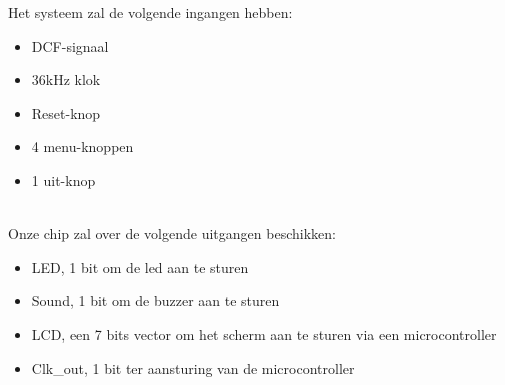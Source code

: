 Het systeem zal de volgende ingangen hebben:
\begin{itemize}[nolistsep]
\item	DCF-signaal
\item	36kHz klok
\item	Reset-knop
\item	4 menu-knoppen
\item  1 uit-knop
\end{itemize}

\noindent
\\
Onze chip zal over de volgende uitgangen beschikken:
\begin{itemize}[nolistsep]
\item	LED, 1 bit om de led aan te sturen
\item	Sound, 1 bit om de buzzer aan te sturen
\item	LCD, een 7 bits vector om het scherm aan te sturen via een microcontroller
\item  Clk\_out, 1 bit ter aansturing van de microcontroller
\end{itemize}